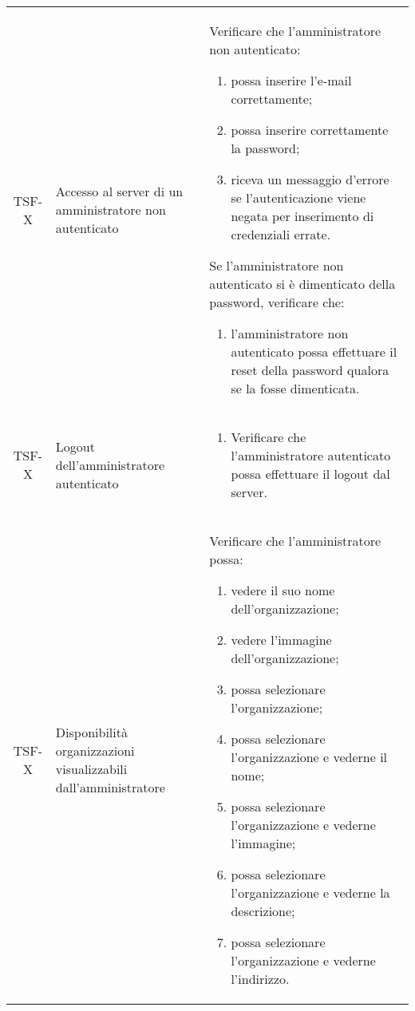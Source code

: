 {\begin{longtable}{ c | C{3cm} | C{11cm} }
TSF-X & Accesso al server di un amministratore non autenticato & 
Verificare che l'amministratore non autenticato:
\begin{enumerate}
    \item possa inserire l'e-mail correttamente;
    \item possa inserire correttamente la password;
    \item riceva un messaggio d'errore se l'autenticazione viene negata per inserimento di credenziali errate.
\end{enumerate}
Se l'amministratore non autenticato si è dimenticato della password, verificare che:
\begin{enumerate}
    \item l'amministratore non autenticato possa effettuare il reset della password qualora se la fosse dimenticata.
\end{enumerate} \\

TSF-X & Logout dell'amministratore autenticato & \begin{enumerate}
    \item Verificare che l'amministratore autenticato possa effettuare il logout dal server.
\end{enumerate} \\

TSF-X & Disponibilità organizzazioni visualizzabili dall'amministratore &
Verificare che l'amministratore possa:
\begin{enumerate}
    \item vedere il suo nome dell'organizzazione;
    \item vedere l'immagine dell'organizzazione;
    \item possa selezionare l'organizzazione;
    \item possa selezionare l'organizzazione e vederne il nome;
    \item possa selezionare l'organizzazione e vederne l'immagine;
    \item possa selezionare l'organizzazione e vederne la descrizione;
    \item possa selezionare l'organizzazione e vederne l'indirizzo.
\end{enumerate} \\


\end{longtable}}
